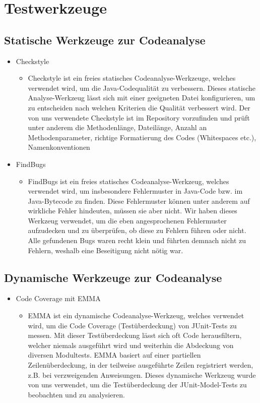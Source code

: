 \section{Testwerkzeuge}
\subsection{Statische Werkzeuge zur Codeanalyse}
\begin{itemize}
\item Checkstyle
\begin{itemize} 
\item Checkstyle ist ein freies statisches Codeanalyse-Werkzeuge, welches verwendet wird, um die Java-Codequalität zu verbessern.
	Dieses statische Analyse-Werkzeug lässt sich mit einer geeigneten Datei konfigurieren, um zu entscheiden nach welchen Kriterien
	die Qualität verbessert wird. Der von uns verwendete Checkstyle ist im Repository vorzufinden und prüft unter anderem die Methodenlänge, 
	Dateilänge, Anzahl an Methodenparameter, richtige Formatierung des Codes (Whitespaces etc.), Namenkonventionen 
	\end{itemize}
\end{itemize}

\begin{itemize}
\item FindBugs
\begin{itemize} 
\item FindBugs ist ein freies statisches Codeanalyse-Werkzeug, welches verwendet wird, um insbesondere Fehlermuster in Java-Code bzw. im Java-Bytecode zu finden.
	Diese Fehlermuster können unter anderem auf wirkliche Fehler hindeuten, müssen sie aber nicht.
	Wir haben dieses Werkzeug verwendet, um die eben angesprochenen Fehlermuster aufzudecken und zu überprüfen, ob diese zu Fehlern
	führen oder nicht. Alle gefundenen Bugs waren recht klein und führten demnach nicht zu Fehlern, weshalb eine Beseitigung nicht nötig war.
\end{itemize}
\end{itemize}

\subsection{Dynamische Werkzeuge zur Codeanalyse}
\begin{itemize}
\item Code Coverage mit EMMA
\begin{itemize} 
\item EMMA ist ein dynamische Codeanalyse-Werkzeug, welches verwendet wird, um die Code Coverage (Testüberdeckung) von JUnit-Tests zu messen.
	Mit dieser Testüberdeckung lässt sich oft  Code herausfiltern, welcher niemals ausgeführt wird und weiterhin die Abdeckung von diversen Modultests.
	EMMA basiert auf einer partiellen Zeilenüberdeckung, in der teilweise ausgeführte Zeilen registriert werden, z.B. bei verzweigenden Anweisungen.
	Dieses dynamische Werkzeug wurde von uns verwendet, um die Testüberdeckung der JUnit-Model-Tests zu beobachten und zu analysieren. 
	\end{itemize}
\end{itemize}

